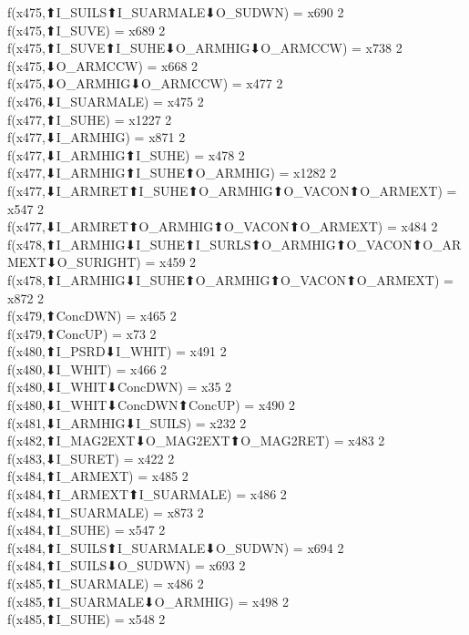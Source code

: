 f(x475,⬆I_SUILS⬆I_SUARMALE⬇O_SUDWN) = x690 {2} \\
f(x475,⬆I_SUVE) = x689 {2} \\
f(x475,⬆I_SUVE⬆I_SUHE⬇O_ARMHIG⬇O_ARMCCW) = x738 {2} \\
f(x475,⬇O_ARMCCW) = x668 {2} \\
f(x475,⬇O_ARMHIG⬇O_ARMCCW) = x477 {2} \\
f(x476,⬇I_SUARMALE) = x475 {2} \\
f(x477,⬆I_SUHE) = x1227 {2} \\
f(x477,⬇I_ARMHIG) = x871 {2} \\
f(x477,⬇I_ARMHIG⬆I_SUHE) = x478 {2} \\
f(x477,⬇I_ARMHIG⬆I_SUHE⬆O_ARMHIG) = x1282 {2} \\
f(x477,⬇I_ARMRET⬆I_SUHE⬆O_ARMHIG⬆O_VACON⬆O_ARMEXT) = x547 {2} \\
f(x477,⬇I_ARMRET⬆O_ARMHIG⬆O_VACON⬆O_ARMEXT) = x484 {2} \\
f(x478,⬆I_ARMHIG⬇I_SUHE⬆I_SURLS⬆O_ARMHIG⬆O_VACON⬆O_ARMEXT⬇O_SURIGHT) = x459 {2} \\
f(x478,⬆I_ARMHIG⬇I_SUHE⬆O_ARMHIG⬆O_VACON⬆O_ARMEXT) = x872 {2} \\
f(x479,⬆ConcDWN) = x465 {2} \\
f(x479,⬆ConcUP) = x73 {2} \\
f(x480,⬆I_PSRD⬇I_WHIT) = x491 {2} \\
f(x480,⬇I_WHIT) = x466 {2} \\
f(x480,⬇I_WHIT⬇ConcDWN) = x35 {2} \\
f(x480,⬇I_WHIT⬇ConcDWN⬆ConcUP) = x490 {2} \\
f(x481,⬇I_ARMHIG⬇I_SUILS) = x232 {2} \\
f(x482,⬆I_MAG2EXT⬇O_MAG2EXT⬆O_MAG2RET) = x483 {2} \\
f(x483,⬇I_SURET) = x422 {2} \\
f(x484,⬆I_ARMEXT) = x485 {2} \\
f(x484,⬆I_ARMEXT⬆I_SUARMALE) = x486 {2} \\
f(x484,⬆I_SUARMALE) = x873 {2} \\
f(x484,⬆I_SUHE) = x547 {2} \\
f(x484,⬆I_SUILS⬆I_SUARMALE⬇O_SUDWN) = x694 {2} \\
f(x484,⬆I_SUILS⬇O_SUDWN) = x693 {2} \\
f(x485,⬆I_SUARMALE) = x486 {2} \\
f(x485,⬆I_SUARMALE⬇O_ARMHIG) = x498 {2} \\
f(x485,⬆I_SUHE) = x548 {2} \\

